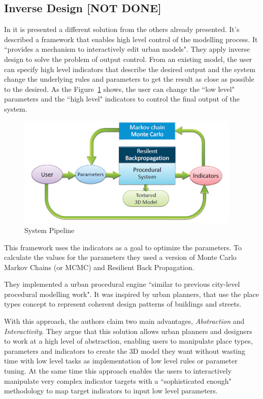 
\subsection{Inverse Design [NOT DONE]} %
\label{sub:inverse_design}


In \cite{Vanegas2009} it is presented a different solution from the others already presented.
It's described a framework that enables high level control of the modelling process. It ``provides a mechanism to interactively edit urban models". They apply inverse design to solve the problem of output control. From an existing model, the user can specify high level indicators that describe the desired output and the system change the underlying rules and parameters to get the result as close as possible to the desired.
As the Figure~\ref{fig:loop} shows, the user can change the ``low level" parameters and the ``high level" indicators to control the final output of the system.

\begin{figure}[htbp]
	\centering
	\includegraphics[width=0.95\textwidth]{img/Inverse_Design/TheLoop.PNG}
	\caption{System Pipeline \cite{Vanegas2009}}
	\label{fig:loop}
\end{figure}

This framework uses the indicators as a goal to optimize the parameters. To calculate the values for the parameters they used a version of Monte Carlo Markov Chains (or MCMC) and Resilient Back Propagation.


They implemented a urban procedural engine ``similar to previous city-level procedural modelling work". It was inspired by urban planners, that use the place types concept to represent coherent design patterns of buildings and streets. 


With this approach, the authors claim two main advantages, \emph{Abstraction} and \emph{Interactivity}. They argue that this solution allows urban planners and designers to work at a high level of abstraction, enabling users to manipulate place types, parameters and indicators to create the 3D model they want without wasting time with low level tasks as implementation of low level rules or parameter tuning.
At the same time this approach enables the users to interactively manipulate very complex indicator targets with a ``sophisticated enough" methodology to map target indicators to input low level parameters.


